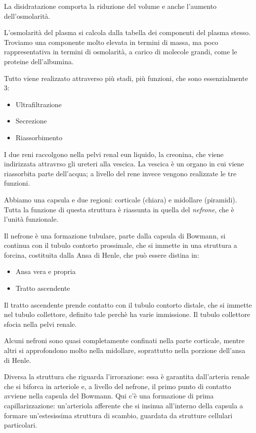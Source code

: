 \documentclass[a4paper,12pt]{article}
\begin{document}
La disidratazione comporta la riduzione del volume e anche l'aumento dell'osmolarità. 

L'osmolarità del plasma si calcola dalla tabella dei componenti del plasma stesso. Troviamo una componente molto elevata in termini di massa, ma poco rappresentativa in termini di osmolarità, a carico di molecole grandi, come le proteine dell'albumina.

Tutto viene realizzato attraverso più stadi, più funzioni, che sono essenzialmente 3:
\begin{itemize}
\item{Ultrafiltrazione}
\item{Secrezione}
\item{Riassorbimento}
 \end{itemize}
 
 I due reni raccolgono nella pelvi renal eun liquido, la creonina, che viene indirizzata attravrso gli ureteri alla vescica. La vescica è un organo in cui viene riassorbita parte dell'acqua; a livello del rene invece vengono realizzate le tre funzioni.
 
 Abbiamo una capsula e due regioni: corticale (chiara) e midollare (piramidi). Tutta la funzione di questa struttura è riassunta in quella del \emph{nefrone}, che è l'unità funzionale.
 
 Il nefrone è una formazione tubulare, parte dalla capsula di Bowmann, si continua con il tubulo contorto prossimale, che si immette in una struttura a forcina, costituita dalla Ansa di Henle, che può essere distina in:
 \begin{itemize}
 \item{Ansa vera e propria}
 \item{Tratto ascendente}
 \end{itemize}
 Il tratto ascendente prende contatto con il tubulo contorto distale, che si immette nel tubulo collettore, definito tale perchè ha varie immissione. Il tubulo collettore sfocia nella pelvi renale.
 
 Alcuni nefroni sono quasi completamente confinati nella parte corticale, mentre altri si approfondono molto nella midollare, soprattutto nella porzione dell'ansa di Henle.
 
Diversa la struttura che riguarda l'irrorazione: essa è garantita dall'arteria renale che si biforca in arteriole e, a livello del nefrone, il primo punto di contatto avviene nella capsula del Bowmann. Qui c'è una formazione di prima capillarizzazione: un'arteriola afferente che si insinua all'interno della capsula a formare un'estesissima struttura di scambio, guardata da strutture cellulari particolari. 
\end{document}
